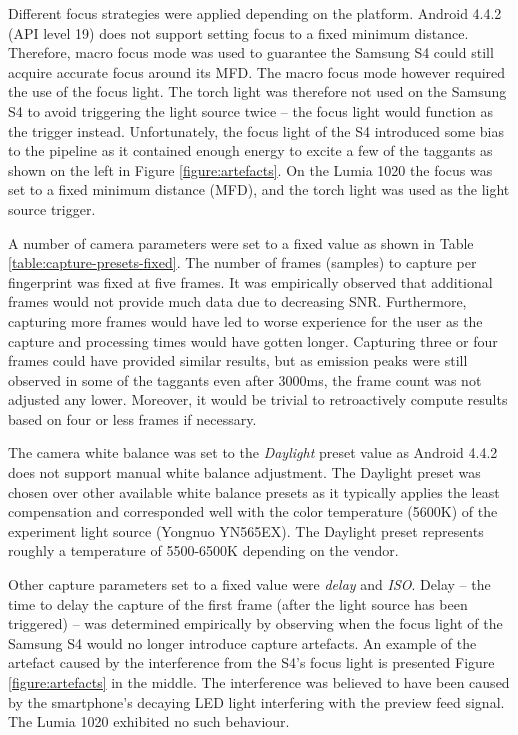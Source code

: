 \documentclass[thesis.tex]{subfiles}
\begin{document}
Different focus strategies were applied depending on the platform. Android 4.4.2 (API level 19) does not support setting focus to a fixed minimum distance. Therefore, macro focus mode was used to guarantee the Samsung S4 could still acquire accurate focus around its MFD. The macro focus mode however required the use of the focus light. The torch light was therefore not used on the Samsung S4 to avoid triggering the light source twice -- the focus light would function as the trigger instead. Unfortunately, the focus light of the S4 introduced some bias to the pipeline as it contained enough energy to excite a few of the taggants as shown on the left in Figure \ref{figure:artefacts}. On the Lumia 1020 the focus was set to a fixed minimum distance (MFD), and the torch light was used as the light source trigger.

A number of camera parameters were set to a fixed value as shown in Table \ref{table:capture-presets-fixed}. The number of frames (samples) to capture per fingerprint was fixed at five frames. It was empirically observed that additional frames would not provide much data due to decreasing SNR. Furthermore, capturing more frames would have led to worse experience for the user as the capture and processing times would have gotten longer. Capturing three or four frames could have provided similar results, but as emission peaks were still observed in some of the taggants even after 3000ms, the frame count was not adjusted any lower. Moreover, it would be trivial to retroactively compute results based on four or less frames if necessary.

The camera white balance was set to the \emph{Daylight} preset value as Android 4.4.2 does not support manual white balance adjustment. The Daylight preset was chosen over other available white balance presets as it typically applies the least compensation and corresponded well with the color temperature (5600K) of the experiment light source (Yongnuo YN565EX). The Daylight preset represents roughly a temperature of 5500-6500K depending on the vendor.

Other capture parameters set to a fixed value were \emph{delay} and \emph{ISO}. Delay -- the time to delay the capture of the first frame (after the light source has been triggered) -- was determined empirically by observing when the focus light of the Samsung S4 would no longer introduce capture artefacts. An example of the artefact caused by the interference from the S4's focus light is presented Figure \ref{figure:artefacts} in the middle. The interference was believed to have been caused by the smartphone's decaying LED light interfering with the preview feed signal. The Lumia 1020 exhibited no such behaviour.
\end{document}
